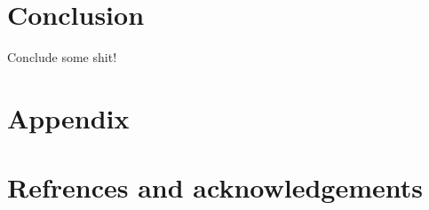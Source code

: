\documentclass[norsk,a4paper,12pt]{article}
\begin{document}
\begin{multicols}{2}

\section{Conclusion} %
\label{sec:conclusion}

Conclude some shit!



\section{Appendix} %
\label{sec:appendix}


\section{Refrences and acknowledgements} %
\label{sec:refrences_and_acknowledgements}






\end{multicols}
\end{document}

